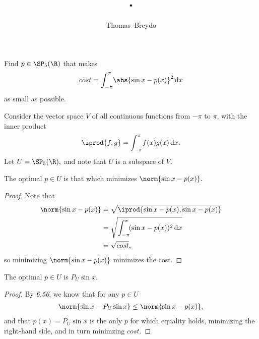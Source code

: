 \documentclass{amsart}
\title{\pagenum.\probnum}
\author{Thomas\ Breydo}
\begin{document}
\maketitle

\begin{problem*}
Find $p\in\SP_5(\R)$ that makes
\begin{align*}
    cost=\int_{-\pi}^\pi\!\abs{\sin x-p(x)}^2\,\mathrm dx
\end{align*}
as small as possible.
\end{problem*}

\vspace{0.5in}

Consider the vector space $V$ of all continuous functions
from $-\pi$ to $\pi$, with the inner product
\begin{align*}
    \iprod{f,g}=\int_{-\pi}^\pi\! f(x)g(x)\,\mathrm dx.
\end{align*}
Let $U=\SP_5(\R),$ and note that $U$ is a subspace of $V.$
\begin{claim*}
The optimal $p\in U$ is that which minimizes
$\norm{\sin x - p(x)}.$
\end{claim*}
\begin{proof}
Note that
\begin{align*}
    \norm{\sin x - p(x)} &= \sqrt{\iprod{\sin x-p(x),\sin x-p(x)}} \\
                         &= \sqrt{
    \int_{-\pi}^\pi\!(\sin x-p(x))^2\,\mathrm dx
                         } \\
                         &= \sqrt{cost},
\end{align*}
so minimizing $\norm{\sin x - p(x)}$ minimizes the cost.
\end{proof}

\begin{claim*}
The optimal $p\in U$ is $P_U\sin x.$
\end{claim*}
\begin{proof}
    
By \textit{6.56}, we know that for any $p\in U$
\begin{align*}
\norm{\sin x - P_U\sin x}\le \norm{\sin x- p(x)},
\end{align*}
and that $p(x)=P_U\sin x$ is the only $p$ for which
equality holds, minimizing the right-hand side,
and in turn minimzing $cost$.
\end{proof}

\newpage
\end{document}
